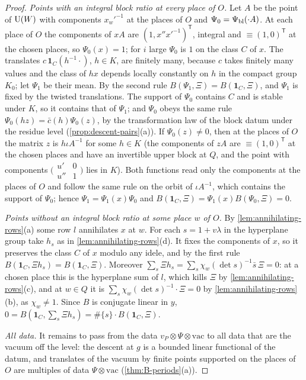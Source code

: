 \begin{proof}
\emph{Points with an integral block ratio at every place of $O$.} Let $A$ be the point of $\operatorname{U}(W)$ with components $x_w'^{-1}$ at the places of $O$ and $\Psi_0=\Psi_{\rm bl}(\cdot A)$. At each place of $O$ the components of $xA$ are
$(1,x''x'^{-1})^{\mathsf T}$, integral and $\equiv(1,0)^{\mathsf T}$ at the chosen places, so $\Psi_0(x)=1$; for $i$ large $\Psi_0$ is $1$ on the class $C$ of $x$. The translates $c\,\mathbf 1_C(h^{-1}\cdot)$, $h\in K$, are finitely many,
because $c$ takes finitely many values and the class of $hx$ depends locally constantly on $h$ in the compact group $K_0$; let $\Psi_1$ be their mean. By the second rule $B(\Psi_1,\Xi)=B(\mathbf 1_C,\Xi)$, and $\Psi_1$ is fixed by
the twisted translations. The support of $\Psi_0$ contains $C$ and is stable under $K$, so it contains that of $\Psi_1$; and $\Psi_0$ obeys the same rule $\Psi_0(hz)=\bar c(h)\Psi_0(z)$, by the transformation law of the block datum
under the residue level (\cref{prop:descent-pairs}(a)). If $\Psi_0(z)\ne0$, then at the places of $O$ the matrix $z$ is $h\iota A^{-1}$ for some $h\in K$ (the components of $zA$ are $\equiv(1,0)^{\mathsf T}$ at the chosen places and have
an invertible upper block at $Q$, and the point with components $\bigl(\begin{smallmatrix}u'&0\\u''&1\end{smallmatrix}\bigr)$ lies in $K$). Both functions read only the components at the places of $O$ and follow the same rule on the
orbit of $\iota A^{-1}$, which contains the support of $\Psi_0$; hence $\Psi_1=\Psi_1(x)\Psi_0$ and $B(\mathbf 1_C,\Xi)=\Psi_1(x)B(\Psi_0,\Xi)=0$.

\emph{Points without an integral block ratio at some place $w$ of $O$.} By \cref{lem:annihilating-rows}(a) some row $l$ annihilates $x$ at $w$. For each $s=1+v\lambda$ in the hyperplane group take $h_s$ as in
\cref{lem:annihilating-rows}(d). It fixes the components of $x$, so it preserves the class $C$ of $x$ modulo any idele, and by the first rule $B(\mathbf 1_C,\Xi h_s)=B(\mathbf 1_C,\Xi)$. Moreover
$\sum_s\Xi h_s=\sum_s\chi_w(\det s)^{-1}\bar s\,\Xi=0$: at a chosen place this is the hyperplane sum of $l$, which kills $\Xi$ by \cref{lem:annihilating-rows}(c), and at $w\in Q$ it is $\sum_s\chi_w(\det s)^{-1}\cdot\Xi=0$ by
\cref{lem:annihilating-rows}(b), as $\chi_w\ne1$. Since $B$ is conjugate linear in $y$, $0=B(\mathbf 1_C,\sum_s\Xi h_s)=\#\{s\}\cdot B(\mathbf 1_C,\Xi)$.

\emph{All data.} It remains to pass from the data $v_P\otimes\Psi\otimes\mathrm{vac}$ to all data that are the vacuum off the level: the descent at $g$ is a bounded linear functional of the datum, and translates of the vacuum by
finite points supported on the places of $O$ are multiples of data $\Psi\otimes\mathrm{vac}$ (\cref{thm:B-periods}(a)).


\end{proof}
